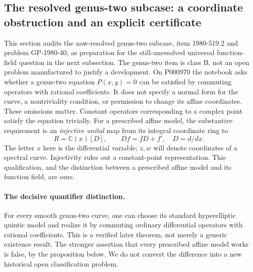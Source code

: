 \subsection{The resolved genus-two subcase: a coordinate obstruction and an explicit certificate}
\label{dev:genus2}

This section audits the now-resolved genus-two subcase, item 1980-519.2 and problem GP-1980-40, as preparation for the still-unresolved universal function-field question in the next subsection. The genus-two item is class B, not an open problem manufactured to justify a development. On P000970 the notebook asks whether a genus-two equation \(P(x,y)=0\) can be satisfied by commuting operators with rational coefficients. It does not specify a normal form for the curve, a nontriviality condition, or permission to change its affine coordinates. These omissions matter. Constant operators corresponding to a complex point satisfy the equation trivially. For a prescribed affine model, the substantive requirement is an \emph{injective unital} map from its integral coordinate ring to
\[
 R=\mathbb C(x)[D],\qquad Df=fD+f',\quad D=d/dx.
\]
The letter \(x\) here is the differential variable; \(z,w\) will denote coordinates of a spectral curve. Injectivity rules out a constant-point representation. This qualification, and the distinction between a prescribed affine model and its function field, are ours.

\paragraph{The decisive quantifier distinction.}
For every smooth genus-two curve, one can choose its standard hyperelliptic quintic model and realize it by commuting ordinary differential operators with rational coefficients. This is a verified later theorem, not merely a generic existence result. The stronger assertion that every prescribed affine model works is false, by the proposition below. We do not convert the difference into a new historical open classification problem.

